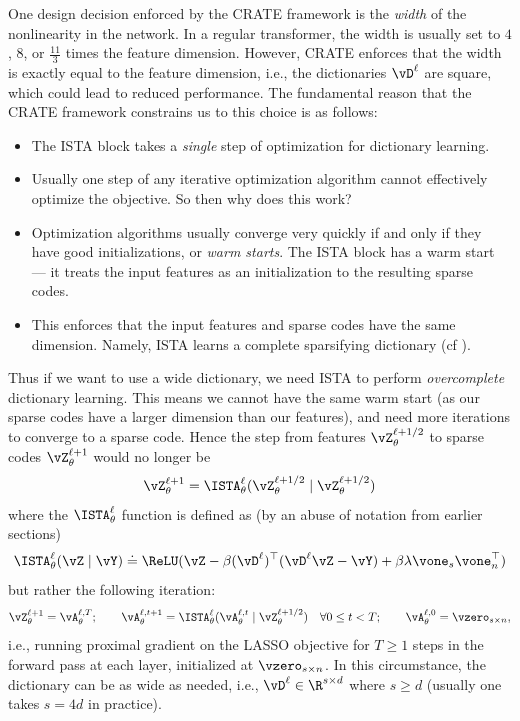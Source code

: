 \documentclass[../../book-main.tex]{subfiles}
\begin{document}
One design decision enforced by the CRATE framework is the \textit{width} of the nonlinearity in the network. In a regular transformer, the width is usually set to \(4\), \(8\), or \(\frac{11}{3}\) times the feature dimension. However, CRATE enforces that the width is exactly equal to the feature dimension, i.e., the dictionaries \(\vD^{\ell}\) are square, which could lead to reduced performance. The fundamental reason that the CRATE framework constrains us to this choice is as follows:
\begin{itemize}
    \item The ISTA block takes a \textit{single} step of optimization for dictionary learning.
    \item Usually one step of any iterative optimization algorithm cannot effectively optimize the objective. So then why does this work?
    \item Optimization algorithms usually converge very quickly if and only if they have good initializations, or \textit{warm starts}. The ISTA block has a warm start --- it treats the input features as an initialization to the resulting sparse codes.
    \item This enforces that the input features and sparse codes have the same dimension. Namely, ISTA learns a complete sparsifying dictionary (cf ).
\end{itemize}
Thus if we want to use a wide dictionary, we need ISTA to perform \textit{overcomplete} dictionary learning. This means we cannot have the same warm start (as our sparse codes have a larger dimension than our features), and need more iterations to converge to a sparse code. Hence the step from features \(\vZ_{\theta}^{\ell + 1/2}\) to sparse codes \(\vZ_{\theta}^{\ell + 1}\) would no longer be 
\begin{equation}
    \vZ_{\theta}^{\ell + 1} = \ISTA_{\theta}^{\ell}(\vZ_{\theta}^{\ell + 1/2} \mid \vZ_{\theta}^{\ell + 1/2})
\end{equation}
where the \(\ISTA_{\theta}^{\ell}\) function is defined as (by an abuse of notation from earlier sections)
\begin{equation}
    \ISTA_{\theta}^{\ell}(\vZ \mid \vY) \doteq \ReLU(\vZ - \beta (\vD^{\ell})^{\top}(\vD^{\ell}\vZ - \vY) + \beta \lambda \vone_{s}\vone_{n}^{\top})
\end{equation}
but rather the following iteration:
\begin{equation}
    \vZ_{\theta}^{\ell + 1} = \vA_{\theta}^{\ell, T}; \qquad \vA_{\theta}^{\ell, t + 1} = \ISTA_{\theta}^{\ell}(\vA_{\theta}^{\ell, t} \mid \vZ_{\theta}^{\ell + 1/2}) \quad \forall 0 \leq t < T; \qquad \vA_{\theta}^{\ell, 0} = \vzero_{s \times n},
\end{equation}
i.e., running proximal gradient on the LASSO objective for \(T \geq 1\) steps in the forward pass at each layer, initialized at \(\vzero_{s \times n}\). In this circumstance, the dictionary can be as wide as needed, i.e., \(\vD^{\ell} \in \R^{s \times d}\) where \(s \geq d\) (usually one takes \(s = 4d\) in practice). 
\end{document}
